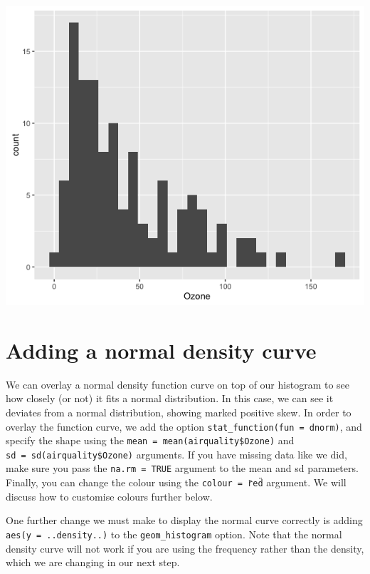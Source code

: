 \begin{center}\includegraphics[width=0.55\linewidth]{0_all_posts_pdf/histogram_1-1} \end{center}

\section{Adding a normal density
curve}\label{adding-a-normal-density-curve}

We can overlay a normal density function curve on top of our histogram
to see how closely (or not) it fits a normal distribution. In this case,
we can see it deviates from a normal distribution, showing marked
positive skew. In order to overlay the function curve, we add the option
\texttt{stat\_function(fun\ =\ dnorm)}, and specify the shape using the
\texttt{mean\ =\ mean(airquality\$Ozone)} and
\texttt{sd\ =\ sd(airquality\$Ozone)} arguments. If you have missing
data like we did, make sure you pass the \texttt{na.rm\ =\ TRUE}
argument to the mean and sd parameters. Finally, you can change the
colour using the \texttt{colour\ =\ \"red\"} argument. We will discuss how
to customise colours further below.

One further change we must make to display the normal curve correctly is
adding \texttt{aes(y\ =\ ..density..)} to the \texttt{geom\_histogram}
option. Note that the normal density curve will not work if you are
using the frequency rather than the density, which we are changing in
our next step.

\begin{Shaded}
\begin{Highlighting}[]
\StringTok{ }\NormalTok{(} \StringTok{ }
\StringTok{      }\NormalTok{(}\NormalTok{(} 
\StringTok{      }\NormalTok{(}  \NormalTok{, }
\StringTok{        } \NormalTok{(}  \NormalTok{), }
\StringTok{        }  \NormalTok{)))}
\end{Highlighting}
\end{Shaded}

